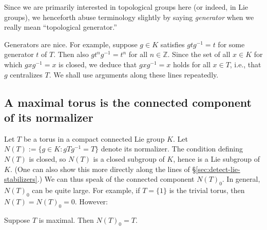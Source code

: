 \documentclass[reqno]{amsart} 
\begin{document}
Since we are primarily interested in topological groups here (or indeed, in Lie groups), we henceforth abuse terminology slightly by saying \emph{generator} when we really mean ``topological generator.''

Generators are nice.  For example, suppose $g \in K$ satisfies $g t g^{-1} = t$ for some generator $t$ of $T$.  Then also $g t^n g^{-1} = t^n$ for all $n \in \mathbb{Z}$.  Since the set of all $x \in K$ for which $g x g^{-1} = x$ is closed, we deduce that $g x g^{-1} = x$ holds for all $x \in T$, i.e., that $g$ centralizes $T$.  We shall use arguments along these lines repeatedly.

\subsection{A maximal torus is the connected component of its normalizer}
\label{sec:org8429097}
Let $T$ be a torus in a compact connected Lie group $K$.  Let $N(T) := \{g \in K : g T g^{-1} = T\}$ denote its normalizer.  The condition defining $N(T)$ is closed, so $N(T)$ is a closed subgroup of $K$, hence is a Lie subgroup of $K$.  (One can also show this more directly along the lines of \S\ref{sec:detect-lie-stabilizers}.)  We can thus speak of the connected component $N(T)_0$.  In general, $N(T)_0$ can be quite large.  For example, if $T = \{1\}$ is the trivial torus, then $N(T) = N(T)_0 = 0$.  However:
\begin{lemma}
  Suppose $T$ is maximal.  Then $N(T)_0 = T$.
\end{lemma}
\end{document}
